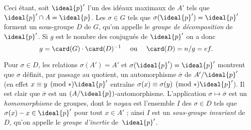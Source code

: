 \documentclass[11pt, useosf,
  title in boldface,
  theorem in new line,
  theorem numbering = section,
  number theorems separately,
]{simplivre}
\begin{document}
    Ceci étant, soit \( \ideal{p}' \) l'un des idéaux maximaux de \( A' \) tels que \( \ideal{p}' \cap A = \ideal{p} \). Les \( \sigma \in G \) tels que \( \sigma(\ideal{p}') = \ideal{p}' \) forment un sous-groupe \( D \) de \( G \), qu'on appelle le \emph{groupe de décomposition} de \( \ideal{p}' \). Si \( g \) est le nombre des conjugués de \( \ideal{p}' \) on a donc
    \begin{equation}\label{eq:card D = ef}
        g = \card(G) \cdot \card(D)^{-1}
        \quad \text{ ou } \quad
        \card(D) = n/g = ef.
    \end{equation}

    Pour \( \sigma \in D \), les relations \( \sigma(A') = A' \) et \( \sigma(\ideal{p}') = \ideal{p}' \) montrent que \( \sigma \) définit, par passage au quotient, un automorphisme \( \overline{\sigma} \) de \( A'/\ideal{p}' \) (en effet \( x \equiv y \pmod*{\ideal{p}'} \) entraîne \( \sigma(x) \equiv \sigma(y) \pmod*{\ideal{p}'} \)). Il est clair que \( \overline{\sigma} \) est un \( (A/\ideal{p}) \)‑automorphisme. L'application \( \sigma \mapsto \overline{\sigma} \) est un \emph{homomorphisme} de groupes, dont le \emph{noyau} est l'ensemble \( I \) des \( \sigma \in D \) tels que \( \sigma(x) - x \in \ideal{p}' \) pour tout \( x \in A' \) ; ainsi \( I \) est un \emph{sous-groupe invariant} de \( D \), qu'on appelle le \emph{groupe d'inertie} de~\( \ideal{p}' \).
\end{document}
